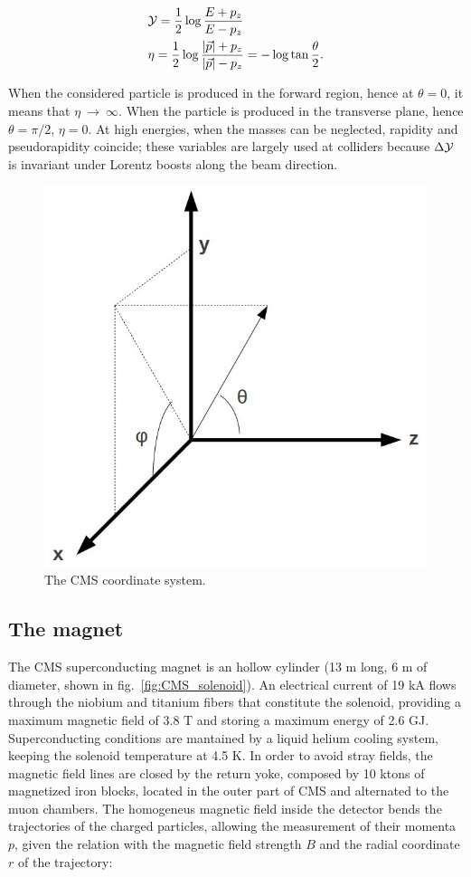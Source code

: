 \begin{equation}
\begin{split}
 & \mathcal{Y} = \frac{1}{2} \log{\frac{E + p_z}{E - p_z}}\\
 & \eta = \frac{1}{2} \log{\frac{|\vec{p}| + p_z}{|\vec{p}| - p_z}} = -\log{\tan{\frac{\theta}{2}}}.
\end{split}
\end{equation}

\noindent When the considered particle is produced in the forward region, hence at $\theta = 0$, it means that $\eta~\rightarrow~\infty$. When the particle is produced in the transverse plane, hence $\theta = \pi /2$, $\eta = 0$. At high energies, when the masses can be neglected, rapidity and pseudorapidity coincide; these variables are largely used at colliders because $\Delta \mathcal{Y}$ is invariant under Lorentz boosts along the beam direction.

\begin{figure}[!htb]
  \centering
    \includegraphics[width=.25\textwidth]{figures/CMS_CoordSys.jpg}
  \caption{The CMS coordinate system.~\cite{CMScoord}}
  \label{fig:CMS_CoordSys}
\end{figure}

\subsection{The magnet}
The CMS superconducting magnet is an hollow cylinder (13 m long, 6 m of diameter, shown in fig.~\ref{fig:CMS_solenoid}). An electrical current of 19 kA flows through the niobium and titanium fibers that constitute the solenoid, providing a maximum magnetic field of 3.8 T and storing a maximum energy of 2.6 GJ. Superconducting conditions are mantained by a liquid helium cooling system, keeping the solenoid temperature at 4.5 K. In order to avoid stray fields, the magnetic field lines are closed by the return yoke, composed by 10 ktons of magnetized iron blocks, located in the outer part of CMS and alternated to the muon chambers. The homogeneus magnetic field inside the detector bends the trajectories of the charged particles, allowing the measurement of their momenta $p$, given the relation with the magnetic field strength $B$ and the radial coordinate $r$ of the trajectory:

